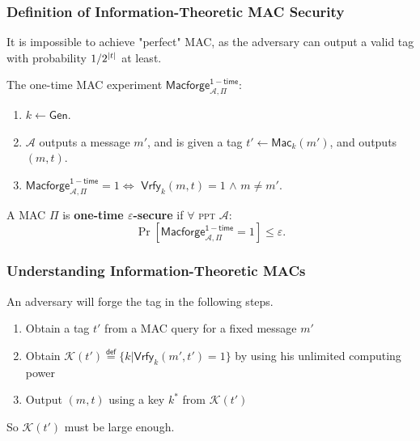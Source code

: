 \begin{frame}\frametitle{Definition of Information-Theoretic MAC Security}
It is impossible to achieve "perfect" MAC, as the adversary can output a valid tag with probability $1/2^{\lvert t\rvert}$ at least.
\newline

The one-time MAC experiment $\mathsf{Macforge}^{\mathsf{1-time}}_{\mathcal{A},\Pi }$:
\begin{enumerate}
\item $k \gets \mathsf{Gen}$.
\item $\mathcal{A}$ outputs a message $m'$, and is given a tag $t' \gets \mathsf{Mac}_k(m')$, and outputs $(m,t)$.
\item $\mathsf{Macforge}^{\mathsf{1-time}}_{\mathcal{A},\Pi }=1 \iff$ $\mathsf{Vrfy}_k(m,t)=1$ $\land$ $m \neq m'$. 
\end{enumerate}
\begin{definition}
A MAC $\Pi$ is \textbf{one-time $\varepsilon$-secure} if $\forall$ \textsc{ppt} $\mathcal{A}$:
\[ \Pr [\mathsf{Macforge}^{\mathsf{1-time}}_{\mathcal{A},\Pi}=1] \le \varepsilon.
\]
\end{definition}
\end{frame}
\begin{frame}\frametitle{Understanding Information-Theoretic MACs}
An adversary will forge the tag in the following steps.
\begin{enumerate}
\item Obtain a tag $t'$ from a MAC query for a fixed message $m'$
\item Obtain $\mathcal{K}(t') \overset{\mathsf{def}}{=} \{ k | \mathsf{Vrfy}_k(m', t') = 1\}$ by using his unlimited computing power
\item Output $(m, t)$ using a key $k^*$ from $\mathcal{K}(t')$
\end{enumerate}
So $\mathcal{K}(t')$ must be large enough.
\begin{figure}
\begin{center}

\end{center}
\end{figure}
\end{frame}
